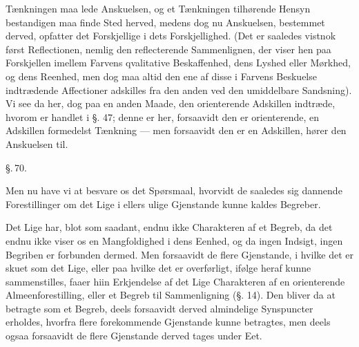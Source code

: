 \documentclass[12pt]{book}
\makeatletter
\def\textit#1{#1}%
\def\emph#1{#1}%
\newcommand{\umph}[2][misc]{%
  \@ifundefined{umph@#1@on}{#2}{\emph{#2}}}
\newcommand{\parag}[1]{%
  \par\vspace{0.9\baselineskip}%
  {\centering\textit{\S.\,#1.}\par}%
  \vspace{0.35\baselineskip}%
  \noindent\hspace{\parindent}\ignorespaces
}
\newcommand{\opage}[1]{\marginnote{\footnotesize\textit{[#1]}}}
\makeatother
\begin{document}
Tænkningen maa lede Anskuelsen, og et Tænkningen tilhørende Hensyn bestandigen maa
finde Sted herved, medens dog nu Anskuelsen, bestemmet derved, opfatter det
Forskjellige i dets Forskjellighed. (Det er saaledes vistnok først Reflectionen,
nemlig den reflecterende Sammenlignen, der viser hen paa Forskjellen imellem Farvens
qvalitative Beskaffenhed, dens Lyshed eller Mørkhed, og dens Reenhed, men dog maa
altid den ene af disse i Farvens Beskuelse indtrædende Affectioner adskilles fra den
anden ved den umiddelbare Sandsning). Vi see da her, dog paa en anden Maade, den
orienterende Adskillen indtræde, hvorom er handlet i §. 47; denne er her, forsaavidt
den er orienterende, en Adskillen formedelst Tænkning --- men forsaavidt den er en
Adskillen, hører den Anskuelsen til.

\parag{70}
Men nu have vi at besvare os det Spørsmaal, hvorvidt de saaledes sig dannende
\umph[schwab]{abstracte} Forestillinger om det Lige i ellers ulige Gjenstande kunne
kaldes Begreber.

Det Lige har, blot som saadant, endnu ikke Charakteren af et Begreb, da det endnu
ikke
\opage{187} viser os en Mangfoldighed i dens Eenhed, og da ingen Indsigt, ingen Begriben er
forbunden dermed. Men forsaavidt de flere Gjenstande, i hvilke det er skuet som det
Lige, eller paa hvilke det er overførligt, ifølge heraf kunne sammenstilles, faaer
hiin Erkjendelse af det Lige Charakteren af en orienterende Almeenforestilling,
eller et Begreb til Sammenligning (§. 14). Den bliver da at betragte som et Begreb,
deels forsaavidt derved almindelige Synspuncter erholdes, hvorfra flere
forekommende Gjenstande kunne betragtes, men deels ogsaa forsaavidt de flere
Gjenstande derved tages under Eet.
\end{document}
